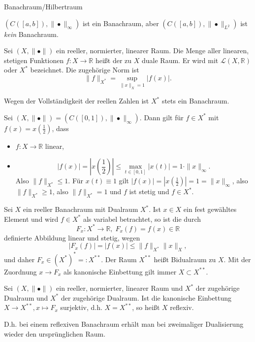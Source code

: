 \documentclass[main.tex]{subfiles}
\begin{document}
\begin{mydef}\label{2.13}
Banachraum/Hilbertraum
\end{mydef}
\begin{bsp*}
$\left( C([a,b]), \|	• \|_\infty \right)$ ist ein Banachraum, aber $\left( C([a,b]), \|•\|_{L^2} \right)$ ist \emph{kein} Banachraum.
\end{bsp*}


\begin{mydef}\label{2.14}
Sei $(X, \| 	• \|)$ ein reeller, normierter, linearer Raum. Die Menge aller linearen, stetigen Funktionen $f\colon X\to ℝ$ heißt der zu $X$ duale Raum. Er wird mit $\mathcal L(X, ℝ)$ oder $X^*$ bezeichnet. Die zugehörige Norm ist
$$\| f\|_{X^*} = \sup_{\|x\|_X = 1} | f(x)|.$$
\end{mydef}
\begin{bem*}
Wegen der Vollständigkeit der reellen Zahlen ist $X^*$ stets ein Banachraum.
\end{bem*}

\begin{bsp}\label{2.15}
Sei $(X, \|•\|) = \left( C([0,1]), \|•\|_∞ \right)$. Dann gilt für $f\in X^*$ mit $f(x) = x \left( \frac{1}{2} \right)$, dass
\begin{itemize}
\item $f\colon X \to ℝ$ linear,
\item $$|f(x)| = \left| x\left( \frac{1}{2} \right)\right|\le \max_{t\in [0,1]} |x(t)| = 1\cdot \| x \|_∞.$$
Also $\| f\|_{X^*} \le 1.$
Für $x(t) \equiv 1$ gilt $|f(x)| = \left| x\left( \frac{1}{2}\right) \right| = 1 = \| x\|_∞$, also $\|f\|_{X^*} \ge 1$, also $\| f\|_{X^*} = 1$ und $f$ ist stetig und $f\in X^*$. 
\end{itemize}
\end{bsp}

Sei $X$ ein reeller Banachraum mit Dualraum $X^*$. Ist $x\in X$ ein fest gewähltes Element und wird $f\in X^*$ als variabel betrachtet, so ist die durch 
$$F_x\colon X^* \to ℝ, \; F_x(f) = f(x)\in ℝ$$
definierte Abbildung linear und stetig, wegen
$$|F_x(f)| = |f(x)|\le \| f\|_{X^*} \| x\|_X,$$
und daher $F_x\in \left( X^* \right)^* =: X^{**}.$
Der Raum $X^{**}$ heißt Bidualraum zu $X$. Mit der Zuordnung $x\to F_x$ als kanonische Einbettung gilt immer $X\subset X^{**}.$

\begin{mydef}
Sei $(X, \| • \|)$ ein reeller, normierter, linearer Raum und $X^*$ der zugehörige Dualraum und $X^*$ der zugehörige Dualraum. Ist die kanonische Einbettung $X \to X^{**}, x\mapsto F_x$ surjektiv, d.h. $X=X^{**}$, so heißt $X$ reflexiv.
\end{mydef}
D.h. bei einem reflexiven Banachraum erhält man bei zweimaliger Dualisierung wieder den ursprünglichen Raum.
\end{document}
